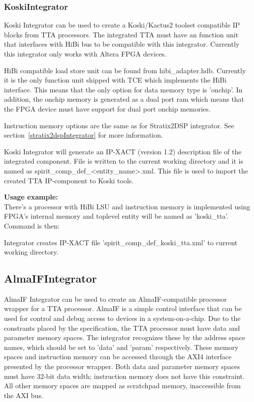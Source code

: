 \documentclass[twoside]{tceusermanual}
\begin{document}
\subsubsection{KoskiIntegrator}

Koski Integrator can be used to create a Koski/Kactus2 toolset
compatible IP blocks from TTA processors. The integrated TTA must have
an function unit that interfaces with HiBi bus to be compatible with
this integrator. Currently this integrator only works with Altera
FPGA devices.

HiBi compatible load store unit can be found from hibi\_adapter.hdb. Currently
it is the only function unit shipped with TCE which implements the HiBi interface.
This means that the only option for data memory type is 'onchip'. In addition,
the onchip memory is generated as a dual port ram which means that the FPGA
device must have support for dual port onchip memories.

Instruction memory options are the same as for Stratix2DSP integrator. See
section~\ref{stratix2dspIntegrator} for more information.

Koski Integrator will generate an IP-XACT (version 1.2) description file of the
integrated component. File is written to the current working directory and it
is named as spirit\_comp\_def\_<entity\_name>.xml. This file is used to import
the created TTA IP-component to Koski tools.

\textbf{Usage example:} \\
There's a processor with HiBi LSU and instruction memory is implemented using
FPGA's internal memory and toplevel entity will be named as 'koski\_tta'.
Command is then:


Integrator creates IP-XACT file 'spirit\_comp\_def\_koski\_tta.xml' to
current working directory.

\subsection{AlmaIFIntegrator}

AlmaIF Integrator can be used to create an AlmaIF-compatible
processor wrapper for a TTA processor. AlmaIF is a simple control interface
that can be used for control and debug access to devices in a system-on-a-chip.
Due to the constrants placed by the specification, the TTA processor must have
data and parameter memory spaces. The integrator recognizes these by the address
space names, which should be set to 'data' and 'param' respectively. These
memory spaces and instruction memory can be accessed through the AXI4 interface
presented by the processor wrapper. Both data and parameter memory spaces must
have 32-bit data width; instruction memory does not have this constraint. All
other memory spaces are mapped as scratchpad memory, inaccessible from the AXI
bus.
\end{document}
